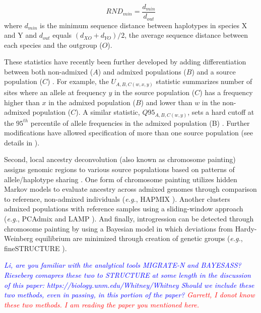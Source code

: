 \documentclass[11pt]{article}
\newcommand{\lwang}[1]{\textcolor{red}{ \emph{\scriptsize  #1}} } %
\newcommand{\gmj}[1]{\textcolor{blue}{ \emph{\scriptsize  #1}} } %
\begin{document}
 \begin{equation}
 	RND_{min} = \frac{d_{min}}{d_{out}}
 \end{equation}
where $d_{min}$ is the minimum sequence distance between haplotypes in species X and Y and $d_{out}$ equals $(d_{XO} + d_{YO})/2$, the average sequence distance between each species and the outgroup ($O$).
 
These statistics have recently been further developed by adding differentiation between both non-admixed ($A$) and admixed populations ($B$) and a source population ($C$) \cite{racimo2016}. 
For example, the $U_{A,B,C(w,x,y)}$ statistic summarizes number of sites where an allele at frequency $y$ in the source population ($C$) has a frequency higher than $x$ in the admixed population ($B$) and lower than $w$ in the non-admixed population ($C$).
A similar statistic, $Q95_{A,B,C(w,y)}$, sets a hard cutoff at the $95^{th}$ percentile of allele frequencies in the admixed population (B) \cite{racimo2016}.
Further modifications have allowed specification of more than one source population (see details in \cite{racimo2016}).
 
Second, local ancestry deconvolution (also known as chromosome painting) assigns genomic regions to various source populations based on patterns of allele/haplotype sharing \cite{schraiber2015}. 
One form of chromosome painting utilizes hidden Markov models to evaluate ancestry across admixed genomes through comparison to reference, non-admixed individuals (\emph{e.g.}, HAPMIX \cite{Price2009}). 
Another clusters admixed populations with reference samples using a sliding-window approach (\emph{e.g.}, PCAdmix \cite{brisbin2012pcadmix} and LAMP \cite{sankararaman2008}).
And finally, introgression can be detected through chromosome painting by using a Bayesian model \cite{pritchard2000} in which deviations from Hardy-Weinberg equilibrium are minimized through creation of genetic groups (\emph{e.g.}, fineSTRUCTURE \cite{Lawson2012}). 

\gmj{Li, are you familiar with the analytical tools MIGRATE-N and BAYESASS?  Rieseberg comapres these two to STRUCTURE at some length in the discussion of this paper:
https://biology.unm.edu/Whitney/Whitney%
Should we include these two methods, even in passing, in this portion of the paper?}
\lwang{Garrett, I donot know these two methods. I am reading the paper you mentioned here.}
\end{document}
